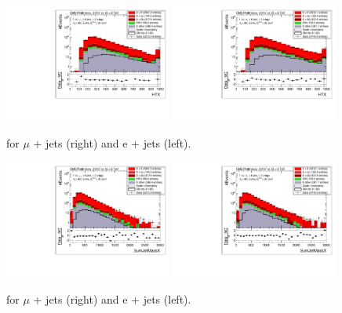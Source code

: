 \begin{figure}[!ht]
    \includegraphics[width=0.49\textwidth]{images/Run1/HTX_StackLogY_Mu.pdf}
    \includegraphics[width=0.49\textwidth]{images/Run1/HTX_StackLogY_e.pdf}
    \caption{\HTX for $\mu$ + jets (right) and e + jets (left).}
    \label{fig:HTX}
\end{figure}

\begin{figure}[!ht]
    \includegraphics[width=0.49\textwidth]{images/Run1/SumJetMassX_StackLogY_Mu.pdf}
    \includegraphics[width=0.49\textwidth]{images/Run1/SumJetMassX_StackLogY_e.pdf}
    \caption{\sumjetmassX for $\mu$ + jets (right) and e + jets (left).}
    \label{fig:sumjetmassX}
\end{figure}

